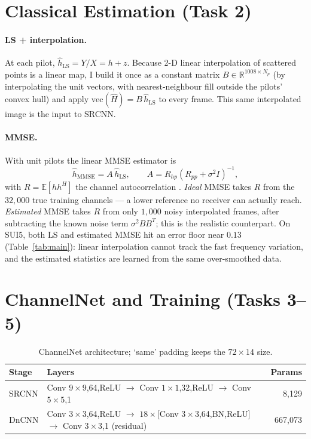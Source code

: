 \documentclass[a4paper,10pt]{article}
\begin{document}
\section{Classical Estimation (Task 2)}
\paragraph{LS + interpolation.} At each pilot, $\hat h_{\mathrm{LS}}=Y/X=h+z$.
Because 2-D linear interpolation of scattered points is a linear map, I build it
once as a constant matrix $B\in\mathbb{R}^{1008\times N_p}$ (by interpolating the
unit vectors, with nearest-neighbour fill outside the pilots' convex hull) and
apply $\mathrm{vec}(\hat H)=B\,\hat h_{\mathrm{LS}}$ to every frame. This same
interpolated image is the input to SRCNN.

\paragraph{MMSE.} With unit pilots the linear MMSE estimator is
\begin{equation}
\hat h_{\mathrm{MMSE}}=A\,\hat h_{\mathrm{LS}},\qquad
A=R_{hp}\left(R_{pp}+\sigma^2 I\right)^{-1},
\end{equation}
with $R=\mathbb{E}[hh^{H}]$ the channel autocorrelation \cite{edfors1998}.
\emph{Ideal} MMSE takes $R$ from the $32{,}000$ true training channels --- a
lower reference no receiver can actually reach. \emph{Estimated} MMSE takes $R$
from only $1{,}000$ noisy interpolated frames, after subtracting the known noise
term $\sigma^2 BB^{T}$; this is the realistic counterpart. On SUI5, both LS and
estimated MMSE hit an error floor near $0.13$ (Table~\ref{tab:main}): linear
interpolation cannot track the fast frequency variation, and the estimated
statistics are learned from the same over-smoothed data.

\section{ChannelNet and Training (Tasks 3--5)}
\begin{table}[H]
\centering\small
\caption{ChannelNet architecture; `same' padding keeps the $72\times14$ size.}
\label{tab:arch}
\begin{tabular}{llr}
\toprule
\textbf{Stage} & \textbf{Layers} & \textbf{Params} \\
\midrule
SRCNN & Conv $9{\times}9$,64,ReLU $\to$ Conv $1{\times}1$,32,ReLU $\to$ Conv $5{\times}5$,1 & 8{,}129 \\
DnCNN & Conv $3{\times}3$,64,ReLU $\to$ $18{\times}$[Conv $3{\times}3$,64,BN,ReLU] $\to$ Conv $3{\times}3$,1 (residual) & 667{,}073 \\
\bottomrule
\end{tabular}
\end{table}
\end{document}
